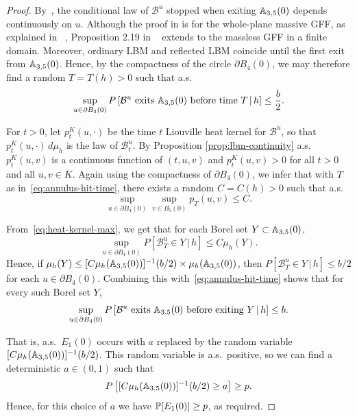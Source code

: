 \documentclass[12pt]{amsart}
\numberwithin{equation}{section}
\begin{document}
\begin{proof}
		By~\cite[Proposition 2.19]{garban2016liouville}, the conditional law of $\mathcal B^u$ stopped when exiting $\A_{3, 5}(0)$ depends continuously on $u$.
		Although the proof in \cite{garban2016liouville} is for the whole-plane massive GFF, as explained in ~\cite[Section 9]{garban2016liouville}, Proposition 2.19 in ~\cite{garban2016liouville} 
		extends to the massless GFF in a finite domain. Moreover, ordinary LBM and reflected LBM coincide until the first exit from $\A_{3,5}(0)$.
		Hence, by the compactness of the circle $\partial B_4(0)$, we may therefore find a random $T = T(h) > 0$ such that a.s.\
		\begin{equation} \label{eq:annulus-hit-time}
		\sup_{u \in \partial B_4(0)}  P\left[ \text{$\mathcal B^u$ exits $\A_{3,5}(0)$ before time $T$} \,|\, h \right] \leq  \frac{b}{2} .
		\end{equation} 
		
		For $t>0$, let $p^K_t(u,\cdot)$ be the time $t$ Liouville heat kernel for $\mathcal B^u$, so that $p^K_t(u,\cdot)\, d\mu_h$ is the law of $\mathcal B^u_t$. 
		By Proposition \ref{prop:lbm-continuity} a.s.\ $p^K_t(u,v)$ is a continuous function of $(t,u,v)$ and  $p^K_t(u,v) > 0$ for all $t > 0$ and all $u,v\in K$. 
		Again using the compactness of $\partial B_4(0)$, we infer that with $T$ as in~\eqref{eq:annulus-hit-time}, there exists a random $C = C(h)  > 0 $ such that a.s.\
		\begin{equation}
		\label{eq:heat-kernel-max}
		\sup_{u\in\partial B_4(0)} \sup_{v\in B_5(0)} p_{T}(u,v) \leq C  .
		\end{equation} 
		
		From~\eqref{eq:heat-kernel-max}, we get that for each Borel set $Y \subset  \A_{3,5}(0)$, 
		\begin{equation}
		\label{eq:heat-kernel-int}
		\sup_{u\in \partial B_4(0)} P\left[ \mathcal B^u_{T} \in Y \,|\, h \right] \leq C \mu_h(Y) .
		\end{equation}
		Hence, if $\mu_h(Y) \leq [ C \mu_h(\A_{3,5}(0) ) ]^{-1} (b/2)  \times \mu_h(\A_{3,5}(0) )$, then $P\left[ \mathcal B^u_{T} \in Y \,|\, h \right] \leq b/2$ for each $u\in \partial B_4(0)$. Combining this with~\eqref{eq:annulus-hit-time} shows that for every such Borel set $Y$,
		\begin{equation}
		\sup_{u \in \partial B_4(0)}  P\left[ \text{$\mathcal B^u$ exits $\A_{3,5}(0)$ before exiting $Y$} \,|\, h \right] \leq b .
		\end{equation}
		
		That is, a.s.\ $E_1(0)$ occurs with $a$ replaced by the random variable $[ C \mu_h(\A_{3,5}(0) ) ]^{-1} (b/2)$. This random variable is a.s.\ positive, so we can find a deterministic $a \in (0,1)$ such that 
		\begin{equation}
		P\left[ [ C \mu_h(\A_{3,5}(0) ) ]^{-1} (b/2) \geq a \right] \geq p . 
		\end{equation}
		Hence, for this choice of $a$ we have $\P[E_1(0)] \geq p$, as required.
	\end{proof}
	
\end{document}
